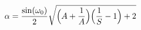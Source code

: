 \hsize 0pt
\vsize 0pt
\nopagenumbers
\overfullrule 0pt
\noindent
$$
\alpha = {\sin(\omega_0) \over 2}
\sqrt{\Bigl(A + {1 \over A}\Bigr)\Bigl({1 \over S} - 1\Bigr) + 2}
$$
\bye